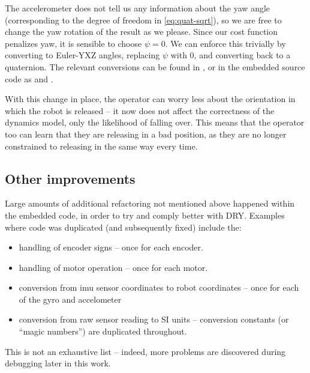 \documentclass[main.tex]{subfiles}
\begin{document}
	The accelerometer does not tell us any information about the yaw angle (corresponding to the degree of freedom in \cref{eq:quat-sqrt}), so we are free to change the yaw rotation of the result as we please.
	Since our cost function penalizes yaw, it is sensible to choose $\psi = 0$.
	We can enforce this trivially by converting to Euler-YXZ angles, replacing $\psi$ with $0$, and converting back to a quaternion\footnotemark. The relevant conversions can be found in \cite[eq~362 and 369]{diebel2006representing}, or in the embedded source code as  and .


	With this change in place, the operator can worry less about the orientation in which the robot is released -- it now does not affect the correctness of the dynamics model, only the likelihood of falling over.
	This means that the operator too can learn that they are releasing in a bad position, as they are no longer constrained to releasing in the same way every time.


\subsection{Other improvements}
	Large amounts of additional refactoring not mentioned above happened within the embedded code, in order to try and comply better with DRY.
	Examples where code was duplicated (and subsequently fixed) include the:
	\begin{itemize}[noitemsep]
		\item handling of encoder signs -- once for each encoder.
		\item handling of motor operation -- once for each motor.
		\item conversion from imu sensor coordinates to robot coordinates -- once for each of the gyro and accelometer
		\item conversion from raw sensor reading to SI units -- conversion constants (or \enquote{magic numbers}) are duplicated throughout.
	\end{itemize}
	This is not an exhaustive list -- indeed, more problems are discovered during debugging later in this work.

\bib
\end{document}
